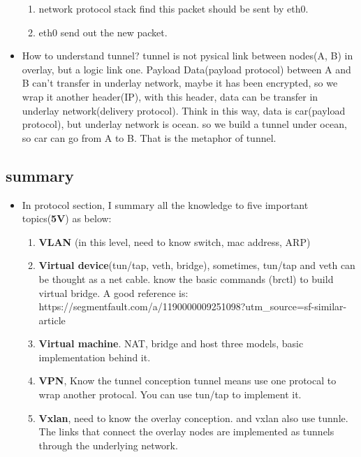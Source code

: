 \documentclass[a4paper,11pt,twoside]{book}
\begin{document}
\begin{itemize}
\begin{enumerate}
	\item network protocol stack find this packet should be sent by eth0. 
	
	\item eth0 send out the new packet. 
\end{enumerate}

	\item How to understand tunnel? tunnel is not pysical link between nodes(A, B) in overlay, but a logic link one.  Payload Data(payload protocol) between A and B can't transfer in underlay network, maybe it has been encrypted, so we wrap it another header(IP), with this header, data can be transfer in underlay network(delivery protocol).  Think in this way, data is car(payload protocol), but underlay network is ocean. so we build a tunnel under ocean, so car can go from A to B. That is the metaphor of tunnel. 
	
\end{itemize}

\subsection{summary}
\begin{itemize}
	\item In protocol section, I summary all the knowledge to five important topics(\textbf{5V}) as below: 
	\begin{enumerate}
		\item \textbf{VLAN} (in this level, need to know switch, mac address, ARP)
		
		\item \textbf{Virtual device}(tun/tap, veth, bridge), sometimes, tun/tap and veth can be thought as a net cable. know the basic commands (brctl) to build virtual bridge.  A good reference is: \\
		https://segmentfault.com/a/1190000009251098?utm\_source=sf-similar-article
		
		\item \textbf{Virtual machine}. NAT, bridge and host three models, basic implementation behind it.
		
		\item \textbf{VPN}, Know the tunnel conception tunnel means use one protocal to wrap another protocal. You can use tun/tap to implement it. 
		
		\item \textbf{Vxlan}, need to know the overlay conception. and vxlan also use tunnle. The links that connect the overlay nodes are implemented as tunnels through the underlying network. 
	\end{enumerate}
\end{itemize}
\end{document}
